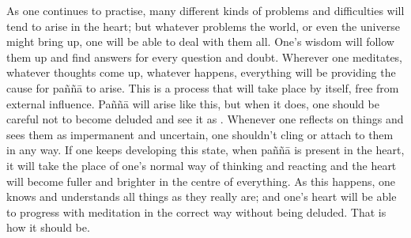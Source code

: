As one continues to practise, many different kinds of problems and difficulties will tend to arise in the heart; but whatever problems the world, or even the universe might bring up, one will be able to deal with them all. One's wisdom will follow them up and find answers for every question and doubt. Wherever one meditates, whatever thoughts come up, whatever happens, everything will be providing the cause for pa\~n\~n\=a to arise. This is a process that will take place by itself, free from external influence. Pa\~n\~n\=a will arise like this, but when it does, one should be careful not to become deluded and see it as . Whenever one reflects on things and sees them as impermanent and uncertain, one shouldn't cling or attach to them in any way. If one keeps developing this state, when pa\~n\~n\=a is present in the heart, it will take the place of one's normal way of thinking and reacting and the heart will become fuller and brighter in the centre of everything. As this happens, one knows and understands all things as they really are; and one's heart will be able to progress with meditation in the correct way without being deluded. That is how it should be.
